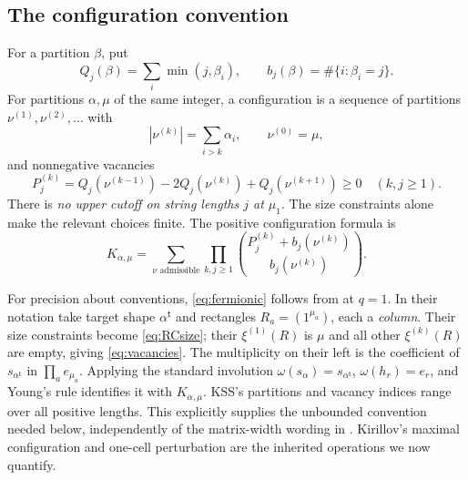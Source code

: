 \documentclass[11pt]{article}
\theoremstyle{remark}\newtheorem{remark}[theorem]{Remark}
\newcommand{\trp}{\mathsf t}\newcommand{\eps}{\varepsilon}
\numberwithin{equation}{section}\setlength{\emergencystretch}{2em}
\begin{document}
\subsection{The configuration convention}\label{sec:rc}
For a partition $\beta$, put
\[
 Q_j(\beta)=\sum_i\min(j,\beta_i),\qquad
 b_j(\beta)=\#\{i:\beta_i=j\}.
\]
For partitions $\alpha,\mu$ of the same integer, a configuration is a
sequence of partitions $\nu^{(1)},\nu^{(2)},\ldots$ with
\begin{equation}\label{eq:RCsize}
 |\nu^{(k)}|=\sum_{i>k}\alpha_i,\qquad \nu^{(0)}=\mu,
\end{equation}
and nonnegative vacancies
\begin{equation}\label{eq:vacancies}
 P_j^{(k)}=Q_j(\nu^{(k-1)})-2Q_j(\nu^{(k)})+Q_j(\nu^{(k+1)})\ge0
 \quad(k,j\ge1).
\end{equation}
There is \emph{no upper cutoff on string lengths $j$ at $\mu_1$}.
The size constraints alone make the relevant choices finite.
The positive configuration formula is
\begin{equation}\label{eq:fermionic}
 K_{\alpha,\mu}=
 \sum_{\nu\text{ admissible}}\prod_{k,j\ge1}
 \binom{P_j^{(k)}+b_j(\nu^{(k)})}{b_j(\nu^{(k)})}.
\end{equation}

For precision about conventions, \eqref{eq:fermionic} follows from
\cite[Section~2.2, (2.4)--(2.6), Theorem~2.10]{KSS} at $q=1$.
In their notation take target shape $\alpha^{\trp}$ and rectangles
$R_a=(1^{\mu_a})$, each a \emph{column}. Their size constraints become
\eqref{eq:RCsize}; their $\xi^{(1)}(R)$ is $\mu$ and all other
$\xi^{(k)}(R)$ are empty, giving \eqref{eq:vacancies}.
The multiplicity on their left is the coefficient of $s_{\alpha^{\trp}}$
in $\prod_a e_{\mu_a}$. Applying the standard involution
$\omega(s_\alpha)=s_{\alpha^{\trp}}$, $\omega(h_r)=e_r$, and Young's
rule identifies it with $K_{\alpha,\mu}$.
KSS's partitions and vacancy indices range over all positive lengths.
This explicitly supplies the unbounded convention needed below, independently
of the matrix-width wording in \cite[Section~1]{Kirillov}.
Kirillov's maximal configuration and one-cell perturbation
\cite[Corollary~1.3 and proof of Theorem~2.1]{Kirillov} are the inherited
operations we now quantify.
\end{document}
